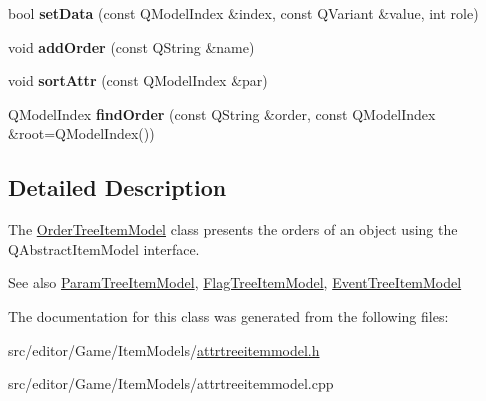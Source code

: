 \begin{DoxyCompactItemize}
\item 
\hypertarget{class_order_tree_item_model_aefa2fc1e67fa7d386f1b46c6b3849805}{bool {\bfseries set\-Data} (const \-Q\-Model\-Index \&index, const \-Q\-Variant \&value, int role)}\label{class_order_tree_item_model_aefa2fc1e67fa7d386f1b46c6b3849805}

\item 
\hypertarget{class_order_tree_item_model_a843617fa941b105f1eaeb14a74ce7baa}{void {\bfseries add\-Order} (const \-Q\-String \&name)}\label{class_order_tree_item_model_a843617fa941b105f1eaeb14a74ce7baa}

\item 
\hypertarget{class_order_tree_item_model_afa451bfae29da693411eeb1712e760a5}{void {\bfseries sort\-Attr} (const \-Q\-Model\-Index \&par)}\label{class_order_tree_item_model_afa451bfae29da693411eeb1712e760a5}

\item 
\hypertarget{class_order_tree_item_model_a84ba3dd59c650ffd766d426263ea3b32}{\-Q\-Model\-Index {\bfseries find\-Order} (const \-Q\-String \&order, const \-Q\-Model\-Index \&root=\-Q\-Model\-Index())}\label{class_order_tree_item_model_a84ba3dd59c650ffd766d426263ea3b32}

\end{DoxyCompactItemize}


\subsection{\-Detailed \-Description}
\-The \hyperlink{class_order_tree_item_model}{\-Order\-Tree\-Item\-Model} class presents the orders of an object using the \-Q\-Abstract\-Item\-Model interface. 

\begin{DoxySeeAlso}{\-See also}
\hyperlink{class_param_tree_item_model}{\-Param\-Tree\-Item\-Model}, \hyperlink{class_flag_tree_item_model}{\-Flag\-Tree\-Item\-Model}, \hyperlink{class_event_tree_item_model}{\-Event\-Tree\-Item\-Model} 
\end{DoxySeeAlso}


\-The documentation for this class was generated from the following files\-:\begin{DoxyCompactItemize}
\item 
src/editor/\-Game/\-Item\-Models/\hyperlink{attrtreeitemmodel_8h}{attrtreeitemmodel.\-h}\item 
src/editor/\-Game/\-Item\-Models/attrtreeitemmodel.\-cpp\end{DoxyCompactItemize}

